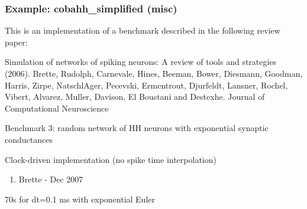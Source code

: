 \documentclass[letterpaper,10pt,english]{manual}
\begin{document}
\hypertarget{index-41}{}\subsubsection{Example: cobahh\_simplified (misc)}

This is an implementation of a benchmark described
in the following review paper:

Simulation of networks of spiking neurons: A review of tools and strategies (2006).
Brette, Rudolph, Carnevale, Hines, Beeman, Bower, Diesmann, Goodman, Harris, Zirpe,
NatschlAger, Pecevski, Ermentrout, Djurfeldt, Lansner, Rochel, Vibert, Alvarez, Muller,
Davison, El Boustani and Destexhe.
Journal of Computational Neuroscience

Benchmark 3: random network of HH neurons with exponential synaptic conductances

Clock-driven implementation
(no spike time interpolation)
\begin{enumerate}
\item {} 
Brette - Dec 2007

\end{enumerate}

70s for dt=0.1 ms with exponential Euler
\end{document}
